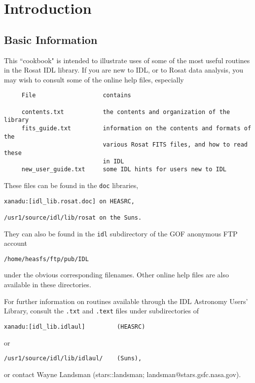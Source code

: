 \chapter{Introduction }
 

\section{Basic Information}
 
This ``cookbook" is intended to illustrate uses of some of the most useful
routines in the Rosat IDL library. If you are new to IDL, or to Rosat data
analysis, you may wish to consult some of the online help files, especially

\medskip\noindent
\begin{verbatim}
     File                   contains
 
     contents.txt           the contents and organization of the library
     fits_guide.txt         information on the contents and formats of the
                            various Rosat FITS files, and how to read these
                            in IDL
     new_user_guide.txt     some IDL hints for users new to IDL
\end{verbatim}
These files can be found in the {\tt doc} libraries,

\medskip\noindent
\begin{verbatim}
xanadu:[idl_lib.rosat.doc] on HEASRC,
 
/usr1/source/idl/lib/rosat on the Suns.
\end{verbatim}
They can also be found in the {\tt idl} subdirectory of the GOF anonymous FTP
account

\medskip\noindent
\begin{verbatim}
/home/heasfs/ftp/pub/IDL
\end{verbatim}
under the obvious corresponding filenames. Other online help files are also
available in these directories.
 
For further information on routines available through the IDL Astronomy Users'
Library, consult the {\tt .txt} and {\tt .text} files under subdirectories of

\medskip\noindent
\begin{verbatim}
xanadu:[idl_lib.idlaul] 		(HEASRC) 	
\end{verbatim}
or

\medskip\noindent
\begin{verbatim}
/usr1/source/idl/lib/idlaul/ 	(Suns),
\end{verbatim}
or contact Wayne Landsman (stars::landsman; landsman@stars.gsfc.nasa.gov).
 

